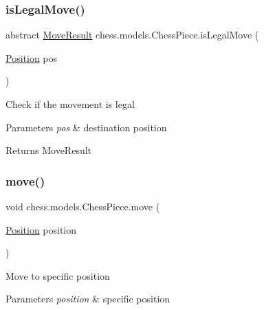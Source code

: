 \subsubsection{\texorpdfstring{is\+Legal\+Move()}{isLegalMove()}}
{\footnotesize\ttfamily abstract \mbox{\hyperlink{enumchess_1_1models_1_1enums_1_1_move_result}{Move\+Result}} chess.\+models.\+Chess\+Piece.\+is\+Legal\+Move (\begin{DoxyParamCaption}\item[{\mbox{\hyperlink{classchess_1_1models_1_1_position}{Position}}}]{pos }\end{DoxyParamCaption})\hspace{0.3cm}{\ttfamily [abstract]}}

Check if the movement is legal


\begin{DoxyParams}{Parameters}
{\em pos} & destination position \\
\hline
\end{DoxyParams}
\begin{DoxyReturn}{Returns}
Move\+Result 
\end{DoxyReturn}
\mbox{\label{classchess_1_1models_1_1_chess_piece_a77865fbd52257338c4e376af525155c7}} 
\subsubsection{\texorpdfstring{move()}{move()}}
{\footnotesize\ttfamily void chess.\+models.\+Chess\+Piece.\+move (\begin{DoxyParamCaption}\item[{\mbox{\hyperlink{classchess_1_1models_1_1_position}{Position}}}]{position }\end{DoxyParamCaption})}

Move to specific position


\begin{DoxyParams}{Parameters}
{\em position} & specific position \\
\hline
\end{DoxyParams}
\mbox{\label{classchess_1_1models_1_1_chess_piece_a2e3c62bde5041ca0aa53e0476cc8b600}} 
